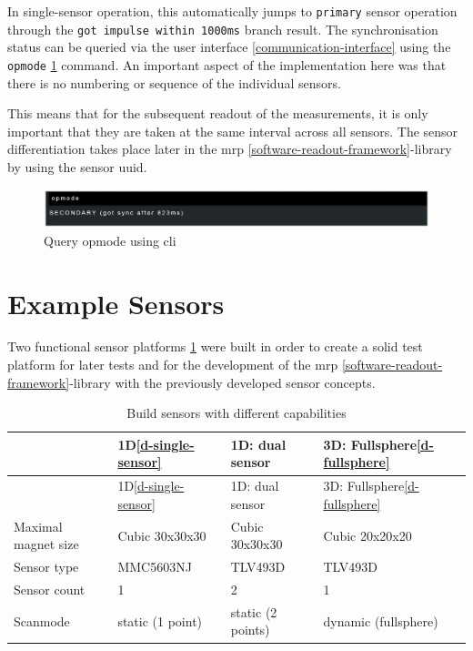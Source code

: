 In single-sensor operation, this automatically jumps to
\passthrough{\lstinline!primary!} sensor operation through the
\passthrough{\lstinline!got impulse within 1000ms!} branch result. The
synchronisation status can be queried via the user interface
\ref{communication-interface} using the \passthrough{\lstinline!opmode!}
\ref{Query_opmode_using_(+cli).png} command. An important aspect of the
implementation here was that there is no numbering or sequence of the
individual sensors.

This means that for the subsequent readout of the measurements, it is
only important that they are taken at the same interval across all
sensors. The sensor differentiation takes place later in the \gls{mrp}
\ref{software-readout-framework}-library by using the sensor \gls{uuid}.

\begin{figure}
\centering
\includegraphics{./generated_images/border_Query_opmode_using_(+cli).png}
\caption{Query opmode using \gls{cli}
\label{Query_opmode_using_(+cli).png}}
\end{figure}

\hypertarget{example-sensors}{%
\section{Example Sensors}\label{example-sensors}}

Two functional sensor platforms
\ref{Build_sensors_with_different_capabilities.csv} were built in order
to create a solid test platform for later tests and for the development
of the \gls{mrp} \ref{software-readout-framework}-library with the
previously developed sensor concepts.

\begin{longtable}[]{@{}llll@{}}
\caption{Build sensors with different capabilities
\label{Build_sensors_with_different_capabilities.csv}}\tabularnewline
\toprule
& 1D\ref{d-single-sensor} & 1D: dual sensor & 3D:
Fullsphere\ref{d-fullsphere}\tabularnewline
\midrule
\endfirsthead
\toprule
& 1D\ref{d-single-sensor} & 1D: dual sensor & 3D:
Fullsphere\ref{d-fullsphere}\tabularnewline
\midrule
\endhead
Maximal magnet size & Cubic 30x30x30 & Cubic 30x30x30 & Cubic
20x20x20\tabularnewline
Sensor type & MMC5603NJ & TLV493D & TLV493D\tabularnewline
Sensor count & 1 & 2 & 1\tabularnewline
Scanmode & static (1 point) & static (2 points) & dynamic
(fullsphere)\tabularnewline
\bottomrule
\end{longtable}

